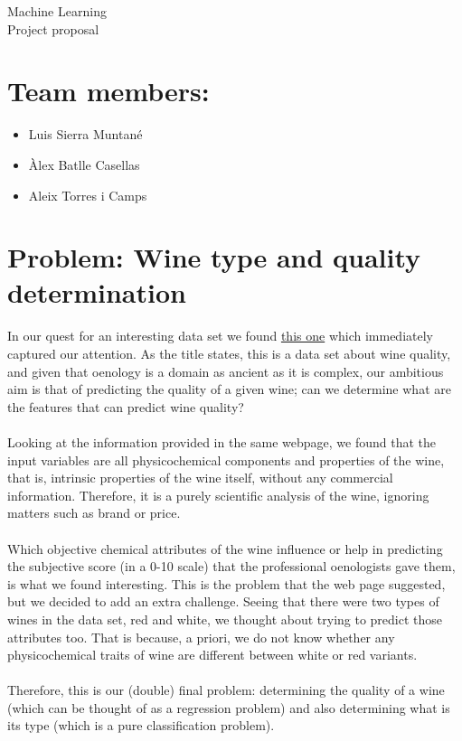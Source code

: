 \documentclass[10pt]{article}
\begin{document}
\begingroup
  \centering
  \Huge Machine Learning \\
  \vskip 0.5cm
  \LARGE Project proposal\\[1.5em]
\endgroup

\section{Team members:}
\begin{itemize}
  \item Luis Sierra Muntané
  \item Àlex Batlle Casellas
  \item Aleix Torres i Camps
\end{itemize}
\vskip 0.3cm

\section{Problem: \color{violet} Wine type and quality determination}

In our quest for an interesting data set we found \href{http://archive.ics.uci.edu/ml/datasets/Wine+Quality}{this one} which immediately captured our attention. As the title states, this is a data set about wine quality, and given that oenology is a domain as ancient as it is complex, our ambitious aim is that of predicting the quality of a given wine; can we determine what are the features that can predict wine quality?
\\ \ \\
Looking at the information provided in the same webpage, we found that the input variables are all physicochemical components and properties of the wine, that is, intrinsic properties of the wine itself, without any commercial information. Therefore, it is a purely scientific analysis of the wine, ignoring matters such as brand or price.
\\ \ \\
Which objective chemical attributes of the wine influence or help in predicting the subjective score (in a 0-10 scale) that the professional oenologists gave them, is what we found interesting. This is the problem that the web page suggested, but we decided to add an extra challenge. Seeing that there were two types of wines in the data set, red and white, we thought about trying to predict those attributes too. That is because, a priori, we do not know whether any physicochemical traits of wine are different between white or red variants.
\\ \ \\
Therefore, this is our (double) final problem: determining the quality of a wine (which can be thought of as a regression problem) and also determining what is its type (which is a pure classification problem).
\\
\end{document}
